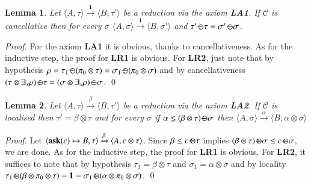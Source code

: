 \documentclass[preprint,12pt]{elsarticle}
\newtheorem{lemma}{Lemma}
\newtheorem{proof}{Proof}
\def\C{{\mathcal C}}
\newcommand{\ask}{{\bf ask}}
\def\monid{{\mathbf 0}}
\def\C{{\mathcal C}}
\def\odiv{\, {\ominus\hspace{-7.7pt} \div} \,}
\def\monid{\mathbf{1}}
\begin{document}
\begin{lemma}
	\label{LA1}
	Let $\langle A, \tau \rangle \xrightarrow{\monid} \langle B, \tau' \rangle$ be a reduction 
	via the axiom {\bf LA1}. 
	If $\C$ is cancellative then 
	for every $\sigma$
	$\langle A, \sigma \rangle \xrightarrow{\monid} \langle B, \sigma' \rangle$
	and $\tau' \odiv \tau = \sigma' \odiv \sigma$.
\end{lemma}
\begin{proof}
	For the axiom {\bf LA1} it is obvious,
	thanks to cancellativeness.
	As for the inductive step, the proof for 
	{\bf LR1} is obvious. For {\bf LR2},
	just note that by hypothesis 
	$\rho = \tau_1 \odiv (\pi_0 \otimes \tau) = \sigma_1 \odiv (\pi_0 \otimes \sigma)$
	and by cancellativeness 
	$(\tau \otimes \exists_x \rho) \odiv \tau = (\sigma \otimes \exists_x \rho) \odiv \sigma$.
	\qed
\end{proof}


\begin{lemma}
	\label{LA2}
	Let $\langle A, \tau \rangle \xrightarrow{\beta} \langle B, \tau' \rangle$ be a reduction 
	via the axiom {\bf LA2}. If $\C$ is localised then $\tau' = \beta \otimes \tau$
	and for every $\sigma$ if $\alpha \leq (\beta \otimes \tau) \odiv \sigma$ then
	$\langle A, \sigma \rangle \xrightarrow{\alpha} \langle B, \alpha \otimes \sigma \rangle$
\end{lemma}
\begin{proof}
	Let $\langle \hbox{\ask}(c) \mapsto B, \tau \rangle \xrightarrow{\beta} \langle A, c \otimes \tau \rangle$.
	Since $\beta \leq c \odiv \tau$ implies 
	$(\beta \otimes \tau)\odiv \sigma \leq c \odiv \sigma$,
	we are done.
	As for the inductive step, the proof for 
	{\bf LR1} is obvious. For {\bf LR2},
	it suffices to note that by hypothesis 
	$\tau_1 = \beta \otimes \tau$ and $\sigma_1 = \alpha \otimes \sigma$
	and by locality 
	$\tau_1 \odiv (\beta \otimes \pi_0 \otimes \tau) = \monid = \sigma_1 \odiv (\alpha \otimes \pi_0 \otimes \sigma)$.
	\qed
\end{proof}
\end{document}
